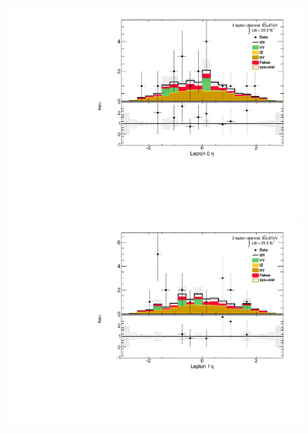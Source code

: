 \begin{figure}[!htbp]
\begin{minipage}[h]{0.5\textwidth}
  \end{minipage}\hfill
  \begin{minipage}[h]{0.5\textwidth}
    \centering \includegraphics[width=\textwidth]{figs/results/plotCand_3lep_Lep0MLEta}
  \end{minipage}\hfill
  \begin{minipage}[h]{0.5\textwidth}
    \centering \includegraphics[width=\textwidth]{figs/results/plotCand_3lep_Lep1MLEta}
  \end{minipage}\hfill
  \begin{minipage}[h]{0.5\textwidth}

\end{minipage}
\end{figure}

